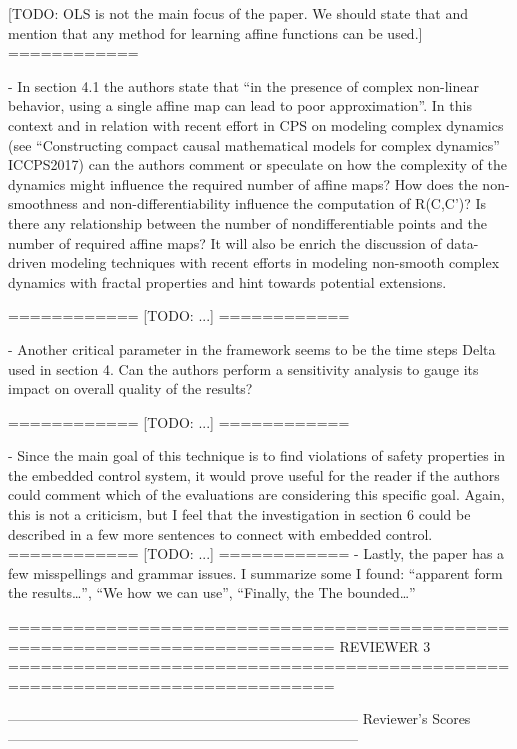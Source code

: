    [TODO: OLS is not the main focus of the paper. We should state that
   and mention that any method for learning affine functions can be
   used.]
   ============

- In section 4.1 the authors state that “in the presence of complex
non-linear behavior, using a single affine map can lead to poor
approximation”. In this context and in relation with recent effort in CPS on
modeling complex dynamics (see “Constructing compact causal mathematical
models for complex dynamics” ICCPS2017) can the authors comment or speculate
on how the complexity of the dynamics might influence the required number of
affine maps? How does the non-smoothness and non-differentiability influence
the computation of R(C,C’)? Is there any relationship between the number of
nondifferentiable points and the number of required affine maps? It will also
be enrich the discussion of data-driven modeling techniques with recent efforts
in modeling non-smooth complex dynamics with fractal properties and hint
towards potential extensions.


   ============
   [TODO: ...]
   ============

- Another critical parameter in the framework seems to be the time steps Delta
used in section 4. Can the authors perform a sensitivity analysis to gauge its
impact on overall quality of the results?

   ============
   [TODO: ...]
   ============

- Since the main goal of this technique is to find violations of safety
properties in the embedded control system, it would prove useful for the reader
if the authors could comment which of the evaluations are considering this
specific goal. Again, this is not a criticism, but I feel that the
investigation in section 6 could be described in a few more sentences to
connect with embedded control.
   ============
   [TODO: ...]
   ============
- Lastly, the paper has a few misspellings and grammar issues. I summarize some
I found: “apparent form the results…”, “We how we can use”,
“Finally, the The bounded…”

============================================================================
                            REVIEWER 3
============================================================================


---------------------------------------------------------------------------
Reviewer's Scores
---------------------------------------------------------------------------

